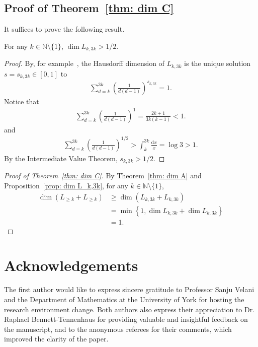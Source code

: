 \documentclass{ws-ijnt}
\begin{document}
	\subsection{Proof of Theorem~\ref{thm: dim C}}
	It suffices to prove the following result.
	\begin{proposition}\label{prop: dim L_k,3k}
		For any $k\in\mathbb{N}\setminus\{1\}$, $\dim{L_{k,3k}}>1/2$.
	\end{proposition}
	\begin{proof}
		By, for example~\cite[Theorem 2]{lee2024explicitupperboundsdecay}, the Hausdorff dimension of $L_{k,3k}$ is the unique solution $s=s_{k,3k}\in[0,1]$ to 
		\begin{align*}
			\sum_{d=k}^{3k}\left(\frac{1}{d(d-1)}\right)^{s_{k,3k}}=1.
		\end{align*}
		Notice that
		\begin{align*}
			\sum_{d=k}^{3k}\left(\frac{1}{d(d-1)}\right)^{1}
			=\frac{2k+1}{3k(k-1)}
			<1.
		\end{align*}
		and
		\begin{align*}
			\sum_{d=k}^{3k}\left(\frac{1}{d(d-1)}\right)^{1/2}
			>\int_{k}^{3k}\frac{\mathrm{d}x}{x}
			=\log{3}
			>1.
		\end{align*}
		By the Intermediate Value Theorem, $s_{k,3k}>1/2$.
	\end{proof}
	\begin{proof}[Proof of Theorem~\ref{thm: dim C}]
		By Theorem~\ref{thm: dim A} and Proposition~\ref{prop: dim L_k,3k}, for any $k\in\mathbb{N}\setminus\{1\}$,
		\begin{align*}
			\dim{(L_{\geq k}+L_{\geq k})}
			&\geq\dim{\left(L_{k,3k}+L_{k,3k}\right)} \\
			&=\min{\left\{1,\dim{L_{k,3k}}+\dim{L_{k,3k}}\right\}} \\
			&=1.
		\end{align*}    
	\end{proof}
	
	\section*{Acknowledgements}
	The first author would like to express sincere gratitude to Professor Sanju Velani and the Department of Mathematics at the University of York for hosting the research environment change. Both authors also express their appreciation to Dr. Raphael Bennett-Tennenhaus for providing valuable and insightful feedback on the manuscript, and to the anonymous referees for their comments, which improved the clarity of the paper.
	
\end{document}
